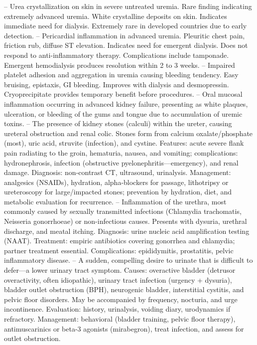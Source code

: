 -- Urea crystallization on skin in severe untreated uremia. Rare finding indicating extremely advanced uremia. White crystalline deposits on skin. Indicates immediate need for dialysis. Extremely rare in developed countries due to early detection.
-- Pericardial inflammation in advanced uremia. Pleuritic chest pain, friction rub, diffuse ST elevation. Indicates need for emergent dialysis. Does not respond to anti-inflammatory therapy. Complications include tamponade. Emergent hemodialysis produces resolution within 2 to 3 weeks.
-- Impaired platelet adhesion and aggregation in uremia causing bleeding tendency. Easy bruising, epistaxis, GI bleeding. Improves with dialysis and desmopressin. Cryoprecipitate provides temporary benefit before procedures.
-- Oral mucosal inflammation occurring in advanced kidney failure, presenting as white plaques, ulceration, or bleeding of the gums and tongue due to accumulation of uremic toxins.
-- The presence of kidney stones (calculi) within the ureter, causing ureteral obstruction and renal colic. Stones form from calcium oxalate/phosphate (most), uric acid, struvite (infection), and cystine. Features: acute severe flank pain radiating to the groin, hematuria, nausea, and vomiting; complications: hydronephrosis, infection (obstructive pyelonephritis—emergency), and renal damage. Diagnosis: non-contrast CT, ultrasound, urinalysis. Management: analgesics (NSAIDs), hydration, alpha-blockers for passage, lithotripsy or ureteroscopy for large/impacted stones; prevention by hydration, diet, and metabolic evaluation for recurrence.
-- Inflammation of the urethra, most commonly caused by sexually transmitted infections (Chlamydia trachomatis, Neisseria gonorrhoeae) or non-infectious causes. Presents with dysuria, urethral discharge, and meatal itching. Diagnosis: urine nucleic acid amplification testing (NAAT). Treatment: empiric antibiotics covering gonorrhea and chlamydia; partner treatment essential. Complications: epididymitis, prostatitis, pelvic inflammatory disease.
-- A sudden, compelling desire to urinate that is difficult to defer—a lower urinary tract symptom. Causes: overactive bladder (detrusor overactivity, often idiopathic), urinary tract infection (urgency + dysuria), bladder outlet obstruction (BPH), neurogenic bladder, interstitial cystitis, and pelvic floor disorders. May be accompanied by frequency, nocturia, and urge incontinence. Evaluation: history, urinalysis, voiding diary, urodynamics if refractory. Management: behavioral (bladder training, pelvic floor therapy), antimuscarinics or beta-3 agonists (mirabegron), treat infection, and assess for outlet obstruction.
